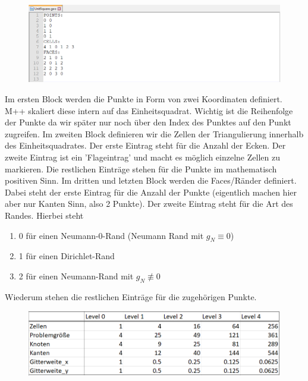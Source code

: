 \documentclass[12pt,a4paper]{scrartcl}
\numberwithin{equation}{section}
\begin{document}
\begin{enumerate}[label=(\roman*)]
\begin{figure}[H]
	\centering
		 \includegraphics[width=\textwidth]{../Geobeispiel.png}
\end{figure}
Im ersten Block werden die Punkte in Form von zwei Koordinaten definiert. M++ skaliert diese intern auf das Einheitsquadrat. Wichtig ist die Reihenfolge der Punkte da wir später nur noch über den Index des Punktes auf den Punkt zugreifen. \newline
Im zweiten Block definieren wir die Zellen der Triangulierung innerhalb des Einheitsquadrates.
Der erste Eintrag steht für die Anzahl der Ecken. Der zweite Eintrag ist ein 'Flageintrag' und macht es möglich einzelne Zellen zu markieren. 
Die restlichen Einträge stehen für die Punkte im mathematisch positiven Sinn. 
Im dritten und letzten Block werden die Faces/Ränder definiert. Dabei steht der erste Eintrag für die Anzahl der Punkte (eigentlich machen hier aber nur Kanten Sinn, also 2 Punkte). Der zweite Eintrag steht für die Art des Randes. Hierbei steht 
\begin{enumerate}
\item 0 für einen Neumann-0-Rand (Neumann Rand mit $g_N \equiv 0$) 
\item 1 für einen Dirichlet-Rand
\item 2 für einen Neumann-Rand mit $g_N \not\equiv 0$
\end{enumerate}
Wiederum stehen die restlichen Einträge für die zugehörigen Punkte. \newline
\par
\begin{figure}[H]
	\centering
	\includegraphics[width=\textwidth]{../Gitterverfeinerung.png} 

\end{figure}
\end{enumerate}
\end{document}
